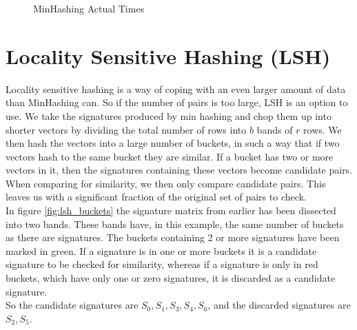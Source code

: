 \documentclass[a4paper,11pt]{article}
\begin{document}
\begin{figure}[H]
    \begin{center}
        
        \caption{MinHashing Actual Times}
        \label{fig:minhashing_at}
    \end{center}
\end{figure}


\section{Locality Sensitive Hashing (LSH)}
Locality sensitive hashing is a way of coping with an even larger amount of data than MinHashing can. So if the number of pairs is too large, LSH is an option to use. We take the signatures produced by min hashing and chop them up into shorter vectors by dividing the total number of rows into $b$ bands of $r$ rows. We then hash the vectors into a large number of buckets, in such a way that if two vectors hash to the same bucket they are similar. If a bucket has two or more vectors in it, then the signatures containing these vectors become candidate pairs. When comparing for similarity, we then only compare candidate pairs. This leaves us with a significant fraction of the original set of pairs to check. \\

In figure \ref{fig:lsh_buckets} the signature matrix from earlier has been dissected into two bands. These bands have, in this example, the same number of buckets as there are signatures. The buckets containing 2 or more signatures have been marked in green. If a signature is in one or more buckets it is a candidate signature to be checked for similarity, whereas if a signature is only in red buckets, which have only one or zero signatures, it is discarded as a candidate signature. \\

So the candidate signatures are $S_0, S_1, S_3, S_4, S_6$, and the discarded signatures are $S_2, S_5$.
\end{document}
